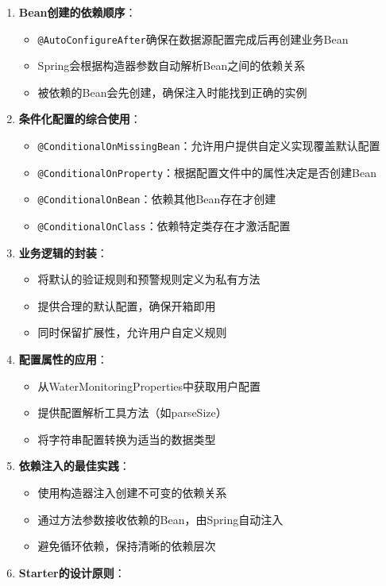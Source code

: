 \begin{enumerate}
\def\labelenumi{\arabic{enumi}.}
\tightlist
\item
  \textbf{Bean创建的依赖顺序}：

  \begin{itemize}
  \tightlist
  \item
    \texttt{@AutoConfigureAfter}确保在数据源配置完成后再创建业务Bean
  \item
    Spring会根据构造器参数自动解析Bean之间的依赖关系
  \item
    被依赖的Bean会先创建，确保注入时能找到正确的实例
  \end{itemize}
\item
  \textbf{条件化配置的综合使用}：

  \begin{itemize}
  \tightlist
  \item
    \texttt{@ConditionalOnMissingBean}：允许用户提供自定义实现覆盖默认配置
  \item
    \texttt{@ConditionalOnProperty}：根据配置文件中的属性决定是否创建Bean
  \item
    \texttt{@ConditionalOnBean}：依赖其他Bean存在才创建
  \item
    \texttt{@ConditionalOnClass}：依赖特定类存在才激活配置
  \end{itemize}
\item
  \textbf{业务逻辑的封装}：

  \begin{itemize}
  \tightlist
  \item
    将默认的验证规则和预警规则定义为私有方法
  \item
    提供合理的默认配置，确保开箱即用
  \item
    同时保留扩展性，允许用户自定义规则
  \end{itemize}
\item
  \textbf{配置属性的应用}：

  \begin{itemize}
  \tightlist
  \item
    从WaterMonitoringProperties中获取用户配置
  \item
    提供配置解析工具方法（如parseSize）
  \item
    将字符串配置转换为适当的数据类型
  \end{itemize}
\item
  \textbf{依赖注入的最佳实践}：

  \begin{itemize}
  \tightlist
  \item
    使用构造器注入创建不可变的依赖关系
  \item
    通过方法参数接收依赖的Bean，由Spring自动注入
  \item
    避免循环依赖，保持清晰的依赖层次
  \end{itemize}
\item
  \textbf{Starter的设计原则}：


\end{enumerate}
